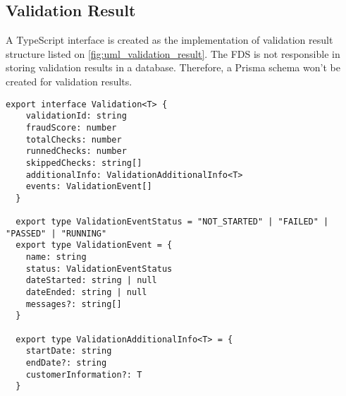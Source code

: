   \subsection{Validation Result}
  
    A TypeScript interface is created as the implementation of validation result structure listed on \autoref{fig:uml_validation_result}. The FDS is not responsible in storing validation results in a database. Therefore, a Prisma schema won't be created for validation results. 

    \begin{lstlisting}[style=es6, caption={TypeScript interface of a validation result (TypeScript)}]
  export interface Validation<T> {
    validationId: string
    fraudScore: number
    totalChecks: number
    runnedChecks: number
    skippedChecks: string[]
    additionalInfo: ValidationAdditionalInfo<T>
    events: ValidationEvent[]
  }

  export type ValidationEventStatus = "NOT_STARTED" | "FAILED" | "PASSED" | "RUNNING"
  export type ValidationEvent = {
    name: string
    status: ValidationEventStatus
    dateStarted: string | null
    dateEnded: string | null
    messages?: string[]
  }

  export type ValidationAdditionalInfo<T> = {
    startDate: string
    endDate?: string
    customerInformation?: T
  }
    \end{lstlisting}